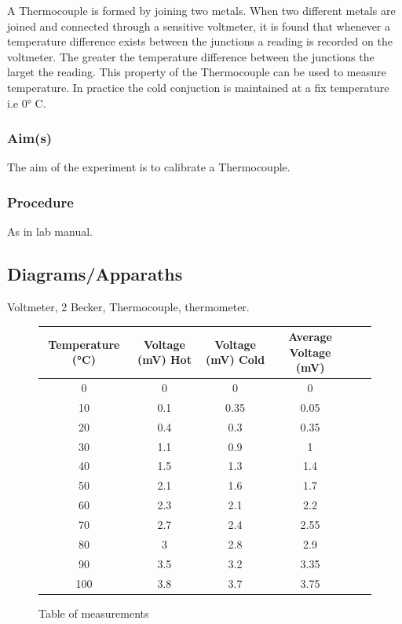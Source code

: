 \documentclass[a4paper]{article}
\begin{document}
A Thermocouple is formed by joining two metals. When two different metals are joined and connected through a sensitive voltmeter, it is found that whenever
a temperature difference exists between the junctions a reading is recorded on the voltmeter.
The greater the temperature difference between the junctions the larget the reading.
This property of the Thermocouple can be used to measure temperature. In practice the cold conjuction is maintained 
at a fix temperature i.e 0° C.

\subsubsection{Aim(s)}

The aim of the experiment is to calibrate a Thermocouple.

\subsubsection{Procedure}

As in lab manual.

\subsection{Diagrams/Apparaths}

Voltmeter, 2 Becker, Thermocouple, thermometer.

\begin{figure}[H]
    \centering
    \begin{tabular}{c|c|c|c|c|c}
        Temperature (°C) & Voltage (mV) Hot & Voltage (mV) Cold & Average Voltage (mV) \\ 
        \hline
        0 & 0 & 0 & 0\\
        10 & 0.1 & 0.35 & 0.05\\
        20 & 0.4 & 0.3 & 0.35\\
        30 & 1.1 & 0.9 & 1\\
        40 & 1.5 & 1.3 & 1.4\\
        50 & 2.1 & 1.6 & 1.7\\
        60 & 2.3 & 2.1 & 2.2\\
        70 & 2.7 & 2.4 & 2.55\\
        80 & 3 & 2.8 & 2.9\\
        90 & 3.5 & 3.2 & 3.35\\ 
        100 & 3.8 & 3.7 & 3.75\\
    \end{tabular}
    \caption{Table of measurements}
    \end{figure}
\end{document}
